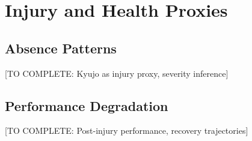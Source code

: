 \section{Injury and Health Proxies}

\subsection{Absence Patterns}

[TO COMPLETE: Kyujo as injury proxy, severity inference]

\subsection{Performance Degradation}

[TO COMPLETE: Post-injury performance, recovery trajectories]
